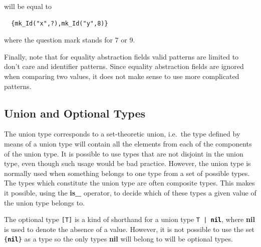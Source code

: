 \documentclass{overturerepchap}
\newcommand{\keyw}[1]{{\bf\ttfamily #1}}
\begin{document}
\begin{description}
will be equal to

\begin{lstlisting}
  {mk_Id("x",?),mk_Id("y",8)}
\end{lstlisting}

where the question mark stands for 7 or 9.

Finally, note that for equality abstraction fields valid patterns are
limited to don't care and identifier patterns. Since equality
abstraction fields are ignored when comparing two values, it does not
make sense to use more complicated patterns.
\end{description}

\subsection{Union and Optional Types}\label{unions}

The union type corresponds to a set-theoretic union, i.e.\ the type
defined by means of a union type will contain all the elements from
each of the components of the union type. It is possible to use types
that are not disjoint in the union type, even though such usage
would be bad practice.  However, the union type is normally used when
something belongs to one type from a set of possible types.  The
types which constitute the union type are often composite types.  This
makes it possible, using the \keyw{is\_} operator, to decide which of
these types a given value of the union type belongs to.

The optional type {\tt [T]} is a kind of shorthand for a union type {\tt T |
  \keyw{nil}}, where \keyw{nil} is used to denote the absence of a
value. However, it is not possible to use the set {\tt \{\keyw{nil}\}}
as a type so the only types \keyw{nil} will belong to will be optional
types. 
\end{document}
